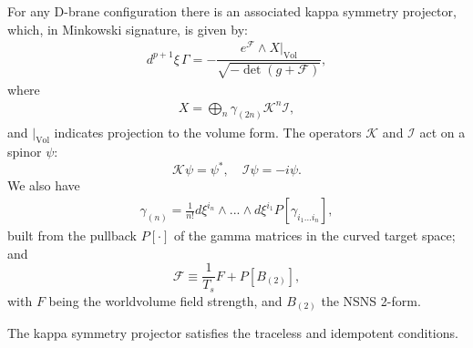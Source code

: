 For any D-brane configuration there is an associated kappa symmetry projector, which, in Minkowski signature, is given by\cite{Skenderis:2002vf}:
\begin{align}
d^{p+1} \xi \, \Gamma = - \dfrac{ e^{\mathcal{F}}\wedge X|_{\text{Vol}}}{\sqrt{-\det  (g+\mathcal{F})}},
\end{align}
where
\begin{align}
X = \bigoplus_n \gamma_{(2n)} \mathcal{K}^n \mathcal{I},
\end{align}
and $|_{\text{Vol}}$ indicates projection to the volume form.
The operators $\mathcal{K}$ and $\mathcal{I}$ act on a spinor $\psi$:
\begin{equation}
 \mathcal{K} \psi = \psi^* , \quad \mathcal{I} \psi = -i \psi.
\end{equation}
We also have
\begin{align}
\gamma_{(n)} = \frac{1}{n !}d\xi^{i_n}\wedge ... \wedge d\xi^{i_1} P[\gamma_{i_1...i_n}],
\end{align}
built from the pullback $P[\cdot]$ of the gamma matrices in the curved target space; and 
\begin{equation}\label{eq:defF}
 \mathcal{F} \equiv \frac{1}{T_s} F + P[B_{(2)}], 
\end{equation}
with $F$ being the worldvolume field strength, and $B_{(2)}$ the NSNS 2-form.

The kappa symmetry projector satisfies the traceless and idempotent conditions.

